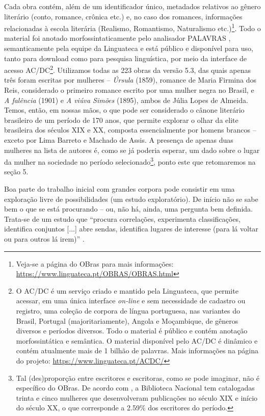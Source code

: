 \documentclass[portuguese]{textolivre}
\begin{document}
Cada obra contém, além de um identificador único, metadados relativos ao gênero literário (conto, romance, crônica etc.) e, no caso dos romances, informações relacionadas à escola literária (Realismo, Romantismo, Naturalismo etc.)\footnote{Veja-se a página do OBras para mais informações: \url{https://www.linguateca.pt/OBRAS/OBRAS.html}}. Todo o material foi anotado morfossintaticamente pelo analisador PALAVRAS \cite{bick2000}, semanticamente pela equipe da Linguateca e está público e disponível para uso, tanto para download como para pesquisa linguística, por meio da interface de acesso AC/DC\footnote{O AC/DC é um serviço criado e mantido pela Linguateca, que permite acessar, em uma única interface \textit{on-line} e sem necessidade de cadastro ou registro, uma coleção de corpora de língua portuguesa, nas variantes do Brasil, Portugal (majoritariamente), Angola e Moçambique, de gêneros diversos e períodos diversos. Todo o material é público e contém anotação morfossintática e semântica. O material disponível pelo AC/DC é dinâmico e contém atualmente mais de 1 bilhão de palavras. Mais informações na página do projeto: \url{https://www.linguateca.pt/ACDC/}}. Utilizamos todas as 223 obras da versão 5.3, das quais apenas três foram escritas por mulheres – \textit{Úrsula} (1859), romance de Maria Firmina dos Reis, considerado o primeiro romance escrito por uma mulher negra no Brasil, e \textit{A falência} (1901) e \textit{A viúva Simões} (1895), ambos de Júlia Lopes de Almeida. Temos, então, em nossas mãos, o que pode ser considerado o cânone literário brasileiro de um período de 170 anos, que permite explorar o olhar da elite brasileira dos séculos XIX e XX, composta essencialmente por homens brancos – exceto por Lima Barreto e Machado de Assis. A presença de apenas duas mulheres na lista de autores é, como se já poderia esperar, um dado sobre o lugar da mulher na sociedade no período selecionado\footnote{Tal (des)proporção entre escritores e escritoras, como se pode imaginar, não é específico do OBras. De acordo com \textcite{santos2014}, a Biblioteca Nacional tem catalogadas trinta e cinco mulheres que desenvolveram publicações no século XIX e início do século XX, o que corresponde a 2.59\% dos escritores do período.}, ponto este que retomaremos na seção 5.

Boa parte do trabalho inicial com grandes corpora pode consistir em uma exploração livre de possibilidades (um estudo exploratório). De início não se sabe bem o que se está procurando – ou, não há, ainda, uma pergunta bem definida. Trata-se de um estudo que “procura correlações, experimenta classificações, identifica conjuntos [...] abre sendas, identifica lugares de interesse (para lá voltar ou para outros lá irem)” \cite[p. 49]{santos2008}.
\end{document}
